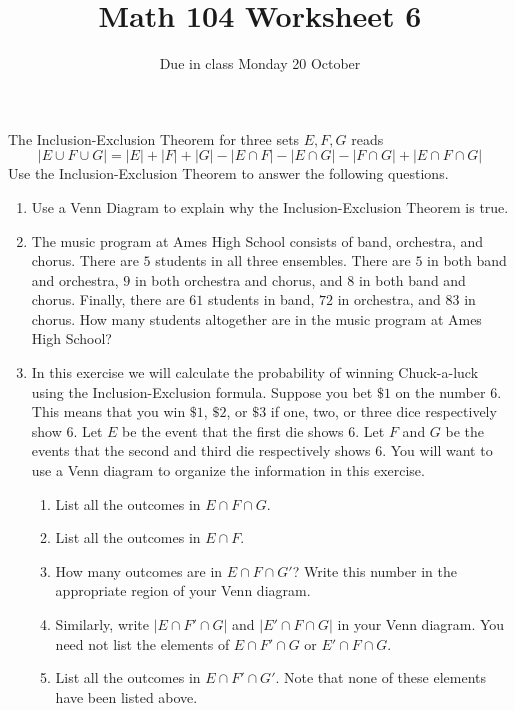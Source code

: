 \documentclass[12pt]{article}
\author{}\date{Due in class Monday 20 October}
\title{Math 104 Worksheet 6}\author{}
\begin{document}
\maketitle
\thispagestyle{empty}

The Inclusion-Exclusion Theorem for three sets $E,F,G$ reads
\[\left|E\cup F\cup G\right|
=\left|E\right|+\left|F\right|+\left|G\right|
-\left|E\cap F\right|
-\left|E\cap G\right|
-\left|F\cap G\right|
+\left|E\cap F\cap G\right|\]
Use the Inclusion-Exclusion Theorem to answer the following questions.
\begin{enumerate}
\item Use a Venn Diagram to explain why
the Inclusion-Exclusion Theorem is true.
\vspace{.5in}
\item The music program at Ames High School
consists of band, orchestra, and chorus. There are
$5$ students in all three ensembles.
There are $5$ in both band and orchestra, $9$
in both orchestra and chorus, and $8$ in both band
and chorus. Finally, there are $61$ students in band,
$72$ in orchestra, and $83$ in chorus. How many students
altogether are in the music program at Ames High School?
\vspace{1in}
\item In this exercise we
will calculate the probability of winning
Chuck-a-luck using the Inclusion-Exclusion formula.
Suppose you bet $\$1$ on the number 6.
This means that you win $\$1$, $\$2$, or $\$3$ 
if one, two, or three dice respectively show 6.
Let $E$ be the event that the first die shows 6.
Let $F$ and $G$ be the events that the second
and third die respectively shows 6.
You will want to use a Venn diagram to organize the
information in this exercise.
\begin{enumerate}
\item List all the outcomes in $E\cap F\cap G$.
\vspace{.5in}
\item List all the outcomes in $E\cap F$.
\vspace{.5in}
\item How many outcomes are in $E\cap F\cap G'$?
Write this number in the appropriate region of your
Venn diagram.
\item Similarly, write $\left|E\cap F'\cap G\right|$
and $\left|E'\cap F\cap G\right|$ in your Venn diagram.
You need not list the elements of $E\cap F'\cap G$
or $E'\cap F\cap G$.
\item List all the outcomes in $E\cap F'\cap G'$.
Note that none of these elements have been listed above.

\end{enumerate}
\end{enumerate}
\end{document}
